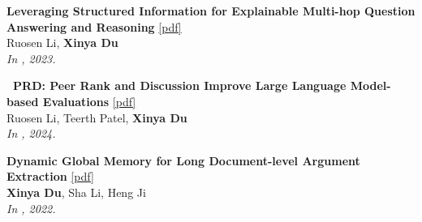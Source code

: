 \begin{enumerate}[{[}1{]},leftmargin=*]
\item 
{\bf Leveraging Structured Information for Explainable Multi-hop Question Answering and Reasoning} 
\href{https://aclanthology.org/2023.findings-emnlp.452.pdf}{{[pdf]}} \\
Ruosen Li, \textbf{Xinya Du} \\
{\it In \EMNLPfinding, 2023.} \\


\item 
{\bf\ PRD: Peer Rank and Discussion Improve Large Language Model-based Evaluations} 
\href{https://openreview.net/pdf?id=YVD1QqWRaj}{{{[pdf]}}} \\
      Ruosen Li, Teerth Patel, \textbf{Xinya Du} \\
{\it In \TMLR, 2024.} \\






\item
{\bf Dynamic Global Memory for Long Document-level Argument Extraction} 
\href{https://aclanthology.org/2022.acl-long.361.pdf}{{[pdf]}} \\
{\bf Xinya Du}, Sha Li, Heng Ji \\
{\it In \ACL, 2022.}\\


\newpage


\end{enumerate}
